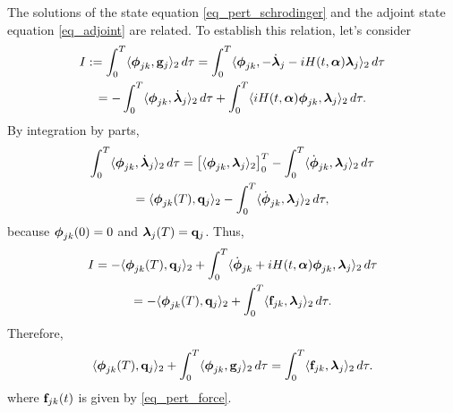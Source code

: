 \documentclass[11pt]{article}
\begin{document}
The solutions of the state equation \eqref{eq_pert_schrodinger} and the adjoint state equation
\eqref{eq_adjoint} are related. To establish this relation, let's consider
\begin{multline}
  I:= \int_0^T \langle \boldsymbol{\phi}_{jk}, {\mathbf g}_j \rangle_2\, d\tau =  \int_0^T \langle \boldsymbol{\phi}_{jk},
  -\dot{\boldsymbol{\lambda}}_j - iH(t,\boldsymbol{\alpha})\boldsymbol{\lambda}_j \rangle_2\, d\tau \\
  =  -\int_0^T \langle  \boldsymbol{\phi}_{jk},
  \dot{\boldsymbol{\lambda}}_{j} \rangle_2\, d\tau +  \int_0^T \langle iH(t,\boldsymbol{\alpha}) \boldsymbol{\phi}_{jk},\boldsymbol{\lambda}_j \rangle_2\, d\tau.
\end{multline}
By integration by parts,
\begin{multline*}
\int_0^T \langle  \phib_{jk}, \dot{\lambdab}_{j} \rangle_2\, d\tau =
%
\left[ \langle \phib_{jk}, \lambdab_j \rangle_2 \right]_0^T - \int_0^T \langle  \dot{\phib}_{jk},
\lambdab_{j} \rangle_2\, d\tau\\
%
= \langle \phib_{jk}(T), \qb_j \rangle_2  - \int_0^T \langle  \dot{\phib}_{jk}, \lambdab_{j} \rangle_2\, d\tau,
\end{multline*}
because $\boldsymbol{\phi}_{jk}(0)=0$ and $\boldsymbol{\lambda}_j(T) = {\mathbf q}_j$. Thus,
\begin{multline*}
I = -\langle \phib_{jk}(T), \qb_j \rangle_2 + \int_0^T \langle \dot{\phib}_{jk} + iH(t,\alphab)
\phib_{jk},\lambdab_j \rangle_2\, d\tau\\
%
= -\langle \phib_{jk}(T), \qb_j \rangle_2 + \int_0^T \langle \fb_{jk},\lambdab_j \rangle_2\, d\tau.
\end{multline*}
Therefore,
\begin{equation}\label{eq_adjoint-rel}
 \langle \boldsymbol{\phi}_{jk}(T), {\mathbf q}_j \rangle_2 + \int_0^T \langle \boldsymbol{\phi}_{jk},{\mathbf g}_j\rangle_2\, d\tau = \int_0^T \langle {\mathbf f}_{jk},\boldsymbol{\lambda}_j \rangle_2\, d\tau.
\end{equation}
where ${\mathbf f}_{jk}(t)$ is given by \eqref{eq_pert_force}.
\end{document}
